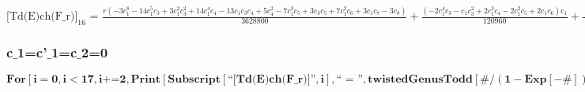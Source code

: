 \documentclass{article}
\newcommand{\unicode}[1]{{}}
\begin{document}
\noindent\(\text{[Td(E)ch(F$\_$r)]}_{16}\text{ = }\frac{r \left(-3 c_1^8-14 c_1^5 c_3+3 c_1^2 c_3^2+14 c_1^4 c_4-13 c_1 c_3 c_4+5 c_4^2-7 c_1^3 c_5+3
c_3 c_5+7 c_1^2 c_6+3 c_1 c_7-3 c_8\right)}{3628800}+\frac{\left(-2 c_1^4 c_3-c_1 c_3^2+2 c_1^3 c_4-2 c_1^2 c_5+2 c_1 c_6\right) \text{c$\unicode{02bc}$}_1}{120960}+\frac{\left(2
c_1^6+5 c_1^3 c_3-c_3^2-5 c_1^2 c_4-2 c_1 c_5+2 c_6\right) \text{c$\unicode{02bc}$}_1^2}{120960}+\frac{\left(c_1^2 c_3-c_1 c_4\right) \left(\text{c$\unicode{02bc}$}_1^3+3
\text{c$\unicode{02bc}$}_3\right)}{8640}+\frac{\left(-c_1^4+c_1 c_3-c_4\right) \left(\text{c$\unicode{02bc}$}_1^4+4 \text{c$\unicode{02bc}$}_1 \text{c$\unicode{02bc}$}_3-4
\text{c$\unicode{02bc}$}_4\right)}{17280}+\frac{c_1^2 \left(\text{c$\unicode{02bc}$}_1^6+6 \text{c$\unicode{02bc}$}_1^3 \text{c$\unicode{02bc}$}_3+3
\text{c$\unicode{02bc}$}_3^2-6 \text{c$\unicode{02bc}$}_1^2 \text{c$\unicode{02bc}$}_4+6 \text{c$\unicode{02bc}$}_1 \text{c$\unicode{02bc}$}_5-6
\text{c$\unicode{02bc}$}_6\right)}{8640}+\frac{c_1 \left(\text{c$\unicode{02bc}$}_1^7+7 \text{c$\unicode{02bc}$}_1^4 \text{c$\unicode{02bc}$}_3+7
\text{c$\unicode{02bc}$}_1 \text{c$\unicode{02bc}$}_3^2-7 \text{c$\unicode{02bc}$}_1^3 \text{c$\unicode{02bc}$}_4-7 \text{c$\unicode{02bc}$}_3 \text{c$\unicode{02bc}$}_4+7
\text{c$\unicode{02bc}$}_1^2 \text{c$\unicode{02bc}$}_5-7 \text{c$\unicode{02bc}$}_1 \text{c$\unicode{02bc}$}_6+7 \text{c$\unicode{02bc}$}_7\right)}{10080}+\frac{\text{c$\unicode{02bc}$}_1^8+8
\text{c$\unicode{02bc}$}_1^5 \text{c$\unicode{02bc}$}_3+12 \text{c$\unicode{02bc}$}_1^2 \text{c$\unicode{02bc}$}_3^2-8 \text{c$\unicode{02bc}$}_1^4
\text{c$\unicode{02bc}$}_4-16 \text{c$\unicode{02bc}$}_1 \text{c$\unicode{02bc}$}_3 \text{c$\unicode{02bc}$}_4+4 \text{c$\unicode{02bc}$}_4^2+8 \text{c$\unicode{02bc}$}_1^3
\text{c$\unicode{02bc}$}_5+8 \text{c$\unicode{02bc}$}_3 \text{c$\unicode{02bc}$}_5-8 \text{c$\unicode{02bc}$}_1^2 \text{c$\unicode{02bc}$}_6+8 \text{c$\unicode{02bc}$}_1
\text{c$\unicode{02bc}$}_7-8 \text{c$\unicode{02bc}$}_8}{40320}\)

\subsubsection*{c$\_$1=c{'}$\_$1=c$\_$2=0}

\begin{doublespace}
\noindent\(\pmb{\text{For}\left[i=0,i<17,i\text{+=}2, \text{Print}\left[\text{Subscript}[\text{{``}[Td(E)ch(F$\_$r)]{''}},i],\text{{``} = {''}},\text{twistedGenusTodd}[\#/(1-\text{Exp}[-\#])\&,i]
\text{/.}c_1\to 0\text{/.}\text{c$\unicode{02bc}$}_1\to 0\text{/.}c_2\to 0\right]\right]}\)
\end{doublespace}
\end{document}
